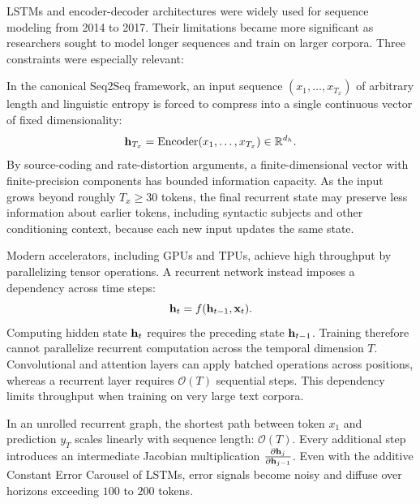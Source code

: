 \documentclass[../../main.tex]{subfiles}
\begin{document}
LSTMs and encoder-decoder architectures were widely used for sequence modeling from 2014 to 2017. Their limitations became more significant as researchers sought to model longer sequences and train on larger corpora. Three constraints were especially relevant:

\medskip

In the canonical Seq2Seq framework, an input sequence $(x_1, \dots, x_{T_x})$ of arbitrary length and linguistic entropy is forced to compress into a single continuous vector of fixed dimensionality:
\begin{equation}
\mathbf{h}_{T_x} = \operatorname{Encoder}(x_1, \dots, x_{T_x}) \in \mathbb{R}^{d_h}.
\end{equation}
By source-coding and rate-distortion arguments, a finite-dimensional vector with finite-precision components has bounded information capacity. As the input grows beyond roughly $T_x \ge 30$ tokens, the final recurrent state may preserve less information about earlier tokens, including syntactic subjects and other conditioning context, because each new input updates the same state.

\medskip

Modern accelerators, including GPUs and TPUs, achieve high throughput by parallelizing tensor operations. A recurrent network instead imposes a dependency across time steps:
\begin{equation}
\mathbf{h}_t = f(\mathbf{h}_{t-1}, \mathbf{x}_t).
\end{equation}
Computing hidden state $\mathbf{h}_t$ requires the preceding state $\mathbf{h}_{t-1}$. Training therefore cannot parallelize recurrent computation across the temporal dimension $T$. Convolutional and attention layers can apply batched operations across positions, whereas a recurrent layer requires $\mathcal{O}(T)$ sequential steps. This dependency limits throughput when training on very large text corpora.

\medskip

In an unrolled recurrent graph, the shortest path between token $x_1$ and prediction $y_T$ scales linearly with sequence length: $\mathcal{O}(T)$. Every additional step introduces an intermediate Jacobian multiplication $\frac{\partial \mathbf{h}_j}{\partial \mathbf{h}_{j-1}}$. Even with the additive Constant Error Carousel of LSTMs, error signals become noisy and diffuse over horizons exceeding $100$ to $200$ tokens.
\end{document}

